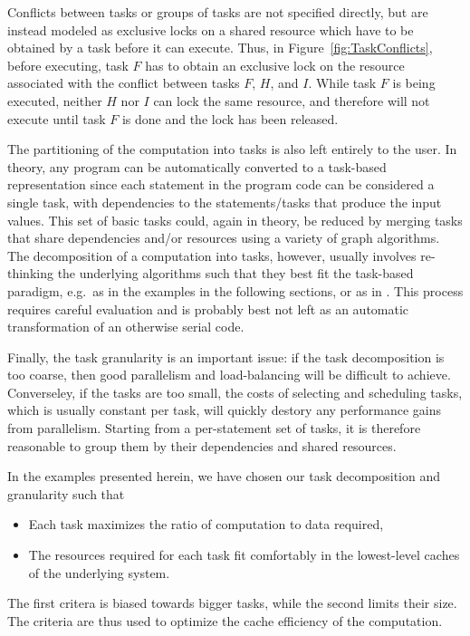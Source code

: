 \documentclass[preprint]{elsarticle}
\newcommand{\fig}[1]
    {Figure~\ref{fig:#1}}
\begin{document}
Conflicts between tasks or groups of tasks are not specified directly,
but are instead modeled as exclusive locks on a shared resource
which have to be obtained by a task before it can execute.
Thus, in \fig{TaskConflicts}, before executing, task $F$ has
to obtain an exclusive lock on the resource associated with
the conflict between tasks $F$, $H$, and $I$.
While task $F$ is being executed, neither $H$ nor $I$ can 
lock the same resource, and therefore will not execute until
task $F$ is done and the lock has been released.

The partitioning of the computation into tasks is also left entirely
to the user.
In theory, any program can be automatically converted to a task-based
representation since each statement in the program code
can be considered a single task, with dependencies to the
statements/tasks that produce the input values.
This set of basic tasks could, again in theory, be reduced by merging
tasks that share dependencies and/or resources using a variety
of graph algorithms.
The decomposition of a computation into tasks, however, usually
involves re-thinking the underlying algorithms such that they
best fit the task-based paradigm, e.g.~as in the examples in the
following sections, or as in \cite{ref:Gonnet2014}.
This process requires careful evaluation and is probably best
not left as an automatic transformation of an otherwise serial code.

Finally, the task granularity is an important issue: if the task
decomposition is too coarse, then good parallelism
and load-balancing will be difficult to achieve.
Converseley, if the tasks are too small, the costs of selecting and
scheduling tasks, which is usually constant per task, will
quickly destory any performance gains from parallelism.
Starting from a per-statement set of tasks, it is therefore
reasonable to group them by their dependencies and shared resources.

In the examples presented herein, we have chosen our task decomposition
and granularity such that
\begin{itemize}
  \item Each task maximizes the ratio of computation to data required,
  \item The resources required for each task fit comfortably in the
    lowest-level caches of the underlying system.
\end{itemize}
\noindent The first critera is biased towards bigger tasks, while the
second limits their size.
The criteria are thus used to optimize the
cache efficiency of the computation.
\end{document}
